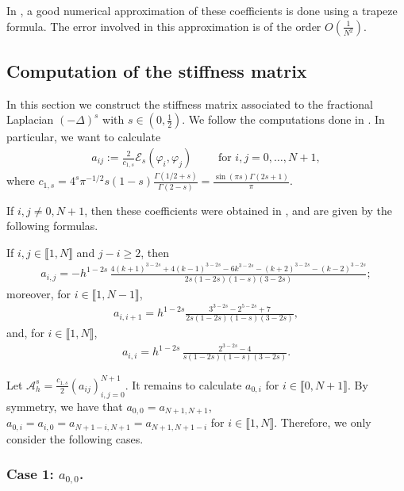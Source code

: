 \documentclass[10 pt]{article}
\newcommand\inter[1]{\llbracket #1\rrbracket}
\numberwithin{equation}{section}
\def\cE{\mathcal{E}}
\begin{document}
In \cite{L22}, a good numerical approximation of these coefficients is done using a trapeze formula.  The error involved in this approximation is of the order $O(\frac{1}{N^2})$.  





\subsection{Computation of the stiffness matrix}\label{sec:s:m}

In this section we construct the stiffness matrix associated to the fractional Laplacian $(-\Delta)^s$ with $s\in(0,\frac{1}{2})$. We follow the computations done in \cite{BH17}.  In particular, we want to calculate
\begin{align*}
a_{ij}:=\frac{2}{c_{1,s}}\cE_s(\varphi_i,\varphi_j)\qquad \text{ for }i,j=0,\ldots, N+1,
\end{align*}
where $c_{1,s}=4^s\pi^{-1/2}s(1-s)\frac{\Gamma(1/2+s)}{\Gamma(2-s)}=\frac{\sin (\pi  s) \Gamma (2 s+1)}{\pi }$.

If $i,j\neq 0,N+1$, then these coefficients were obtained in \cite{BH17}, and are given by the following formulas. 

If $i,j\in\inter{1,N}$ and $j-i\geq 2$, then
\begin{align*}
	a_{i,j} = - h^{1-2s}\,\frac{4(k+1)^{3-2s} + 4(k-1)^{3-2s}-6k^{3-2s}-(k+2)^{3-2s}-(k-2)^{3-2s}}{2s(1-2s)(1-s)(3-2s)};
\end{align*} 
moreover, for $i\in\inter{1,N-1}$,
\begin{align*}
	a_{i,i+1} =	\displaystyle h^{1-2s}\frac{3^{3-2s}-2^{5-2s}+7}{2s(1-2s)(1-s)(3-2s)},
\end{align*}
and, for  $i\in\inter{1,N}$,
\begin{align*}
	a_{i,i} =
			\displaystyle h^{1-2s}\,\frac{2^{3-2s}-4}{s(1-2s)(1-s)(3-2s)}.
\end{align*}

Let $\mathcal A^s_h=\frac{c_{1,s}}{2}(a_{ij})_{i,j=0}^{N+1}$. It remains to calculate $a_{0,i}$ for $i\in\inter{0,N+1}$.  By symmetry, we have that $a_{0,0}=a_{N+1,N+1}$, $a_{0,i}=a_{i,0}=a_{N+1-i,N+1}=a_{N+1,N+1-i}$ for $i\in\inter{1,N}$. Therefore, we only consider the following cases.

\subsubsection{Case 1: $a_{0,0}$.}
\end{document}
